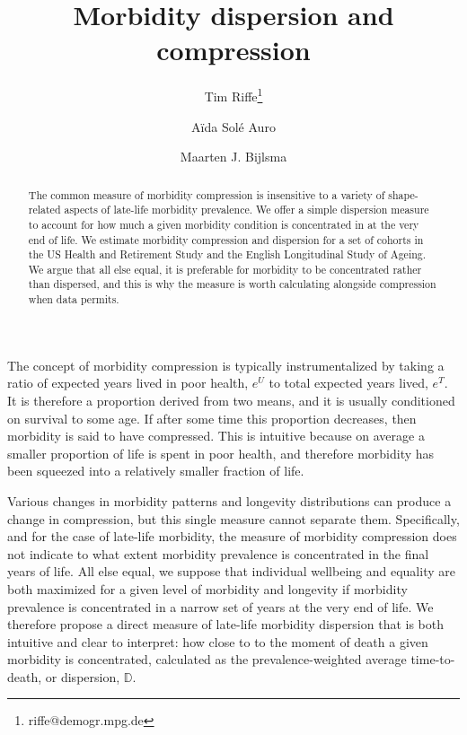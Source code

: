 \documentclass{article}
\begin{document}
\title{Morbidity dispersion and compression}

\author[1]{Tim Riffe\thanks{riffe@demogr.mpg.de}}
\author[2]{A{\"i}da Sol\'{e} Auro}
\author[1]{Maarten J. Bijlsma}

\maketitle

\begin{abstract}
The common measure of morbidity compression is insensitive to a variety of
shape-related aspects of late-life morbidity prevalence. We offer a simple
dispersion measure to account for how much a given morbidity condition is concentrated in at the very end of life.
We estimate morbidity compression and
dispersion for a set of cohorts in the US Health and Retirement Study and the
English Longitudinal Study of Ageing. We argue that all else equal, it is preferable for morbidity to be concentrated
rather than dispersed, and this is why the measure is worth calculating
alongside compression when data permits. 
\end{abstract}

The concept of morbidity compression is typically instrumentalized by taking a
ratio of expected years lived in poor health, $e^U$ to total expected years
lived, $e^T$.
It is therefore a proportion derived from two means, and it is usually conditioned on survival to some age. If after some time this proportion
decreases, then morbidity is said to have compressed. This is intuitive because on average a smaller proportion of life is spent in
poor health, and therefore morbidity has been squeezed into a relatively smaller
fraction of life.

Various changes in morbidity patterns and longevity
distributions can produce a change in compression, but this single
measure cannot separate them. Specifically, and for the case of late-life morbidity, the measure of
morbidity compression does not indicate to what extent morbidity prevalence is
concentrated in the final years of life. All else equal, we suppose that
individual wellbeing and equality are both maximized for a given level of
morbidity and longevity if morbidity prevalence is concentrated in a narrow set of years at the very end of
life.
We therefore propose a direct measure of late-life morbidity dispersion that
is both intuitive and clear to interpret: how close to to the moment of death a given morbidity is
concentrated, calculated as the prevalence-weighted average
time-to-death, or dispersion, $\mathbb{D}$.
\end{document}
